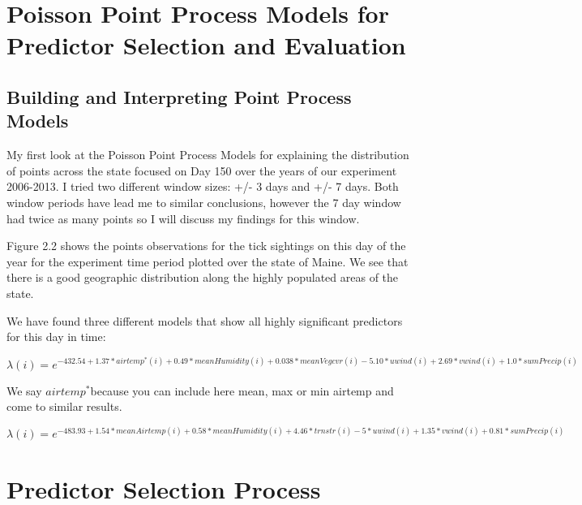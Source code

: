 \section{Poisson Point Process Models for Predictor Selection and Evaluation}

\subsection{ Building and Interpreting Point Process Models}

\noindent My first look at the Poisson Point Process Models for explaining the distribution of points across the state focused on Day 150 over the years of our experiment 2006-2013. I tried two different window sizes: +/- 3 days and +/- 7 days. Both window periods have lead me to similar conclusions, however the 7 day window had twice as many points so I will discuss my findings for this window.\newline

\noindent Figure 2.2 shows the points observations for the tick sightings on this day of the year for the experiment time period plotted over the state of Maine. We see that there is a good geographic distribution along the highly populated areas of the state. \newline

\noindent We have found three different models that show all highly significant predictors for this day in time:

\begin{equation}
\lambda(i) = e^{-432.54 + 1.37*airtemp^*(i) + 0.49*meanHumidity(i) + 0.038*meanVegcvr(i) - 5.10*uwind(i) + 2.69*vwind(i) + 1.0*sumPrecip(i) }
\end{equation}

\noindent We say $airtemp^* $because you can include here mean, max or min airtemp and come to similar results.


\begin{equation}
\lambda(i) = e^{-483.93 + 1.54*meanAirtemp(i) + 0.58*meanHumidity(i) + 4.46*trnstr(i) - 5*uwind(i) + 1.35*vwind(i) + 0.81*sumPrecip(i) }
\end{equation}
\newline


\section{Predictor Selection Process}

